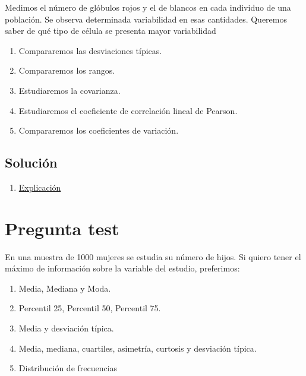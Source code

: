 \documentclass[
]{book}
\providecommand{\tightlist}{%
  \setlength{\itemsep}{0pt}\setlength{\parskip}{0pt}}
\begin{document}
Medimos el número de glóbulos rojos y el de blancos en cada individuo de una población. Se observa determinada variabilidad en esas cantidades. Queremos saber de qué tipo de célula se presenta mayor variabilidad

\begin{enumerate}
\def\labelenumi{\alph{enumi})}
\tightlist
\item
  Compararemos las desviaciones típicas.
\item
  Compararemos los rangos.
\item
  Estudiaremos la covarianza.
\item
  Estudiaremos el coeficiente de correlación lineal de Pearson.
\item
  Compararemos los coeficientes de variación.
\end{enumerate}

\hypertarget{soluciuxf3n-48}{%
\subsection{Solución}\label{soluciuxf3n-48}}

\begin{enumerate}
\def\labelenumi{\alph{enumi})}
\setcounter{enumi}{4}
\tightlist
\item
  \href{https://en.wikipedia.org/wiki/Coefficient_of_variation}{Explicación}
\end{enumerate}

\hypertarget{pregunta-test-47}{%
\section{Pregunta test}\label{pregunta-test-47}}

En una muestra de 1000 mujeres se estudia su número de hijos. Si quiero tener el máximo de información sobre la variable del estudio, preferimos:

\begin{enumerate}
\def\labelenumi{\alph{enumi})}
\tightlist
\item
  Media, Mediana y Moda.
\item
  Percentil 25, Percentil 50, Percentil 75.
\item
  Media y desviación típica.
\item
  Media, mediana, cuartiles, asimetría, curtosis y desviación típica.
\item
  Distribución de frecuencias
\end{enumerate}
\end{document}
